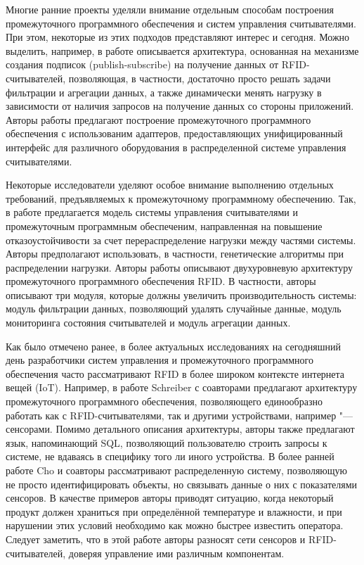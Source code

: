 Многие ранние проекты уделяли внимание отдельным способам построения промежуточного программного обеспечения и систем управления считывателями. При этом, некоторые из этих подходов представляют интерес и сегодня. Можно выделить, например, в работе \cite{Yu2009} описывается архитектура, основанная на механизме создания подписок (publish-subscribe) на получение данных от RFID-считывателей, позволяющая, в частности, достаточно просто решать задачи фильтрации и агрегации данных, а также динамически менять нагрузку в зависимости от наличия запросов на получение данных со стороны приложений. Авторы работы \cite{Koutsoubelias2007} предлагают построение промежуточного программного обеспечения с использованим адаптеров, предоставляющих унифицированный интерфейс для различного оборудования в распределенной системе управления считывателями.

Некоторые исследователи уделяют особое внимание выполнению отдельных требований, предъявляемых к промежуточному программному обеспечению. Так, в работе \cite{Chien-ChangHsu2008} предлагается модель системы управления считывателями и промежуточным программным обеспеченим, направленная на повышение отказоустойчивости за счет перераспределение нагрузки между частями системы. Авторы предполагают использовать, в частности, генетические алгоритмы при распределении нагрузки. Авторы работы \cite{XiuLi2012} описывают двухуровневую архитектуру промежуточного программного обеспечения RFID. В частности, авторы описывают три модуля, которые должны увеличить производительность системы: модуль фильтрации данных, позволяющий удалять случайные данные, модуль мониторинга состояния считывателей и модуль агрегации данных.

Как было отмечено ранее, в более актуальных исследованиях на сегодняшний день разработчики систем управления и промежуточного программного обеспечения часто рассматривают RFID в более широком контексте интернета вещей (IoT). Например, в работе \cite{Schreiber2012} Schreiber с соавторами предлагают архитектуру промежуточного программного обеспечения, позволяющего единообразно работать как с RFID-считывателями, так и другими устройствами, например "--- сенсорами. Помимо детального описания архитектуры, авторы также предлагают язык, напоминающий SQL, позволяющий пользователю строить запросы к системе, не вдаваясь в специфику того ли иного устройства. В более ранней работе \cite{Cho2007} Cho и соавторы рассматривают распределенную систему, позволяющую не просто идентифицировать объекты, но связывать данные о них с показателями сенсоров. В качестве примеров авторы приводят ситуацию, когда некоторый продукт должен храниться при определённой температуре и влажности, и при нарушении этих условий необходимо как можно быстрее известить оператора. Следует заметить, что в этой работе авторы разносят сети сенсоров и RFID-считывателей, доверяя управление ими различным компонентам.

